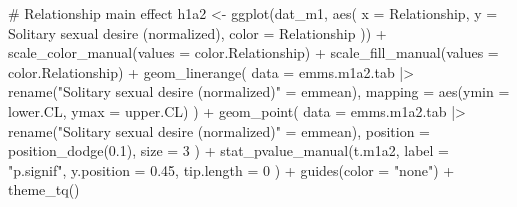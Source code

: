 \documentclass[
  bookmarksnumbered]{article}
\newenvironment{Shaded}{\begin{snugshade}}{\end{snugshade}}
\newcommand{\AttributeTok}[1]{\textcolor[rgb]{0.80,0.80,0.80}{#1}}
\newcommand{\CommentTok}[1]{\textcolor[rgb]{0.50,0.62,0.50}{#1}}
\newcommand{\DecValTok}[1]{\textcolor[rgb]{0.86,0.86,0.80}{#1}}
\newcommand{\FloatTok}[1]{\textcolor[rgb]{0.75,0.75,0.82}{#1}}
\newcommand{\FunctionTok}[1]{\textcolor[rgb]{0.94,0.94,0.56}{#1}}
\newcommand{\NormalTok}[1]{\textcolor[rgb]{0.80,0.80,0.80}{#1}}
\newcommand{\OtherTok}[1]{\textcolor[rgb]{0.94,0.94,0.56}{#1}}
\newcommand{\SpecialCharTok}[1]{\textcolor[rgb]{0.86,0.64,0.64}{#1}}
\newcommand{\StringTok}[1]{\textcolor[rgb]{0.80,0.58,0.58}{#1}}
\begin{document}
\begin{Shaded}
\begin{Highlighting}[]
\CommentTok{\# Relationship main effect}
\NormalTok{h1a2 }\OtherTok{\textless{}{-}} \FunctionTok{ggplot}\NormalTok{(dat\_m1, }\FunctionTok{aes}\NormalTok{(}
  \AttributeTok{x =}\NormalTok{ Relationship, }\AttributeTok{y =} \StringTok{\textasciigrave{}}\AttributeTok{Solitary sexual desire (normalized)}\StringTok{\textasciigrave{}}\NormalTok{,}
  \AttributeTok{color =}\NormalTok{ Relationship}
\NormalTok{)) }\SpecialCharTok{+}
  \FunctionTok{scale\_color\_manual}\NormalTok{(}\AttributeTok{values =}\NormalTok{ color.Relationship) }\SpecialCharTok{+}
  \FunctionTok{scale\_fill\_manual}\NormalTok{(}\AttributeTok{values =}\NormalTok{ color.Relationship) }\SpecialCharTok{+}
  \FunctionTok{geom\_linerange}\NormalTok{(}
    \AttributeTok{data =}\NormalTok{ emms.m1a2.tab }\SpecialCharTok{|\textgreater{}}
      \FunctionTok{rename}\NormalTok{(}\StringTok{"Solitary sexual desire (normalized)"} \OtherTok{=}\NormalTok{ emmean),}
    \AttributeTok{mapping =} \FunctionTok{aes}\NormalTok{(}\AttributeTok{ymin =}\NormalTok{ lower.CL, }\AttributeTok{ymax =}\NormalTok{ upper.CL)}
\NormalTok{  ) }\SpecialCharTok{+}
  \FunctionTok{geom\_point}\NormalTok{(}
    \AttributeTok{data =}\NormalTok{ emms.m1a2.tab }\SpecialCharTok{|\textgreater{}}
      \FunctionTok{rename}\NormalTok{(}\StringTok{"Solitary sexual desire (normalized)"} \OtherTok{=}\NormalTok{ emmean),}
    \AttributeTok{position =} \FunctionTok{position\_dodge}\NormalTok{(}\FloatTok{0.1}\NormalTok{),}
    \AttributeTok{size =} \DecValTok{3}
\NormalTok{  ) }\SpecialCharTok{+}
  \FunctionTok{stat\_pvalue\_manual}\NormalTok{(t.m1a2,}
    \AttributeTok{label =} \StringTok{"p.signif"}\NormalTok{,}
    \AttributeTok{y.position =} \FloatTok{0.45}\NormalTok{,}
    \AttributeTok{tip.length =} \DecValTok{0}
\NormalTok{  ) }\SpecialCharTok{+}
  \FunctionTok{guides}\NormalTok{(}\AttributeTok{color =} \StringTok{"none"}\NormalTok{) }\SpecialCharTok{+}
  \FunctionTok{theme\_tq}\NormalTok{()}


\end{Highlighting}
\end{Shaded}
\end{document}
